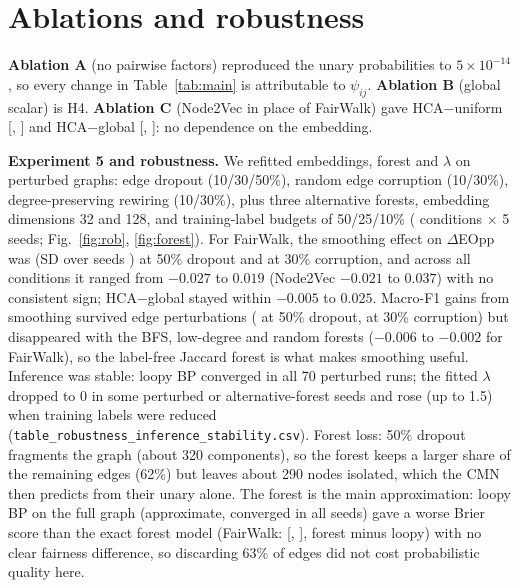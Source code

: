 \documentclass[11pt,a4paper]{article}
\begin{document}
\section{Ablations and robustness}
\textbf{Ablation A} (no pairwise factors) reproduced the unary probabilities to $5\times10^{-14}$, so every change in Table~\ref{tab:main} is attributable to $\psi_{ij}$. \textbf{Ablation B} (global scalar) is H4. \textbf{Ablation C} (Node2Vec in place of FairWalk) gave HCA$-$uniform \REthreeDeoppG{} [\REthreeDeoppGLo, \REthreeDeoppGHi] and HCA$-$global \REfourDeoppG{} [\REfourDeoppGLo, \REfourDeoppGHi]: no dependence on the embedding.

\textbf{Experiment 5 and robustness.} We refitted embeddings, forest and $\lambda$ on perturbed graphs: edge dropout (10/30/50\%), random edge corruption (10/30\%), degree-preserving rewiring (10/30\%), plus three alternative forests, embedding dimensions 32 and 128, and training-label budgets of 50/25/10\% (\RRobConditions{} conditions $\times$ 5 seeds; Fig.~\ref{fig:rob}, \ref{fig:forest}). For FairWalk, the smoothing effect on $\Delta$EOpp was \RRobDropoutpfiveDeoppGenderSmooth{} (SD over seeds \RRobDropoutpfiveDeoppGenderSmoothsd) at 50\% dropout and \RRobCorruptpthreeDeoppGenderSmooth{} at 30\% corruption, and across all conditions it ranged from $-0.027$ to $0.019$ (Node2Vec $-0.021$ to $0.037$) with no consistent sign; HCA$-$global stayed within $-0.005$ to $0.025$. Macro-F1 gains from smoothing survived edge perturbations (\RRobDropoutpfiveMacroFSmooth{} at 50\% dropout, \RRobCorruptpthreeMacroFSmooth{} at 30\% corruption) but disappeared with the BFS, low-degree and random forests ($-0.006$ to $-0.002$ for FairWalk), so the label-free Jaccard forest is what makes smoothing useful. Inference was stable: loopy BP converged in all 70 perturbed runs; the fitted $\lambda$ dropped to 0 in some perturbed or alternative-forest seeds and rose (up to 1.5) when training labels were reduced (\texttt{table\_robustness\_inference\_stability.csv}). Forest loss: 50\% dropout fragments the graph (about 320 components), so the forest keeps a larger share of the remaining edges (62\%) but leaves about 290 nodes isolated, which the CMN then predicts from their unary alone. The forest is the main approximation: loopy BP on the full graph (approximate, converged in all seeds) gave a worse Brier score than the exact forest model (FairWalk: \REeightBrier{} [\REeightBrierLo, \REeightBrierHi], forest minus loopy) with no clear fairness difference, so discarding 63\% of edges did not cost probabilistic quality here.
\end{document}
